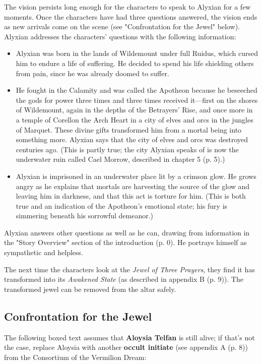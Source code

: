 \documentclass[letterpaper, 11pt, bg=full, twocolumn]{dndbook}
\begin{document}
The vision persists long enough for the characters to speak to Alyxian for a few moments. Once the characters have had three questions answered, the vision ends as new arrivals come on the scene (see "Confrontation for the Jewel" below). Alyxian addresses the characters' questions with the following information:

\begin{itemize}
\item Alyxian was born in the lands of Wildemount under full Ruidus, which cursed him to endure a life of suffering. He decided to spend his life shielding others from pain, since he was already doomed to suffer.
\item He fought in the Calamity and was called the Apotheon because he beseeched the gods for power three times and three times received it---first on the shores of Wildemount, again in the depths of the Betrayers' Rise, and once more in a temple of Corellon the Arch Heart in a city of elves and orcs in the jungles of Marquet. These divine gifts transformed him from a mortal being into something more. Alyxian says that the city of elves and orcs was destroyed centuries ago. (This is partly true; the city Alyxian speaks of is now the underwater ruin called Cael Morrow, described in chapter 5 (p. 5).)
\item Alyxian is imprisoned in an underwater place lit by a crimson glow. He grows angry as he explains that mortals are harvesting the source of the glow and leaving him in darkness, and that this act is torture for him. (This is both true and an indication of the Apotheon's emotional state; his fury is simmering beneath his sorrowful demeanor.)
\end{itemize}

Alyxian answers other questions as well as he can, drawing from information in the "Story Overview" section of the introduction (p. 0). He portrays himself as sympathetic and helpless.

The next time the characters look at the \textit{Jewel of Three Prayers}, they find it has transformed into its \textit{Awakened State} (as described in appendix B (p. 9)). The transformed jewel can be removed from the altar safely.

\subsection{Confrontation for the Jewel}

The following boxed text assumes that \textbf{Aloysia Telfan} is still alive; if that's not the case, replace Aloysia with another \textbf{occult initiate} (see appendix A (p. 8)) from the Consortium of the Vermilion Dream:
\end{document}

